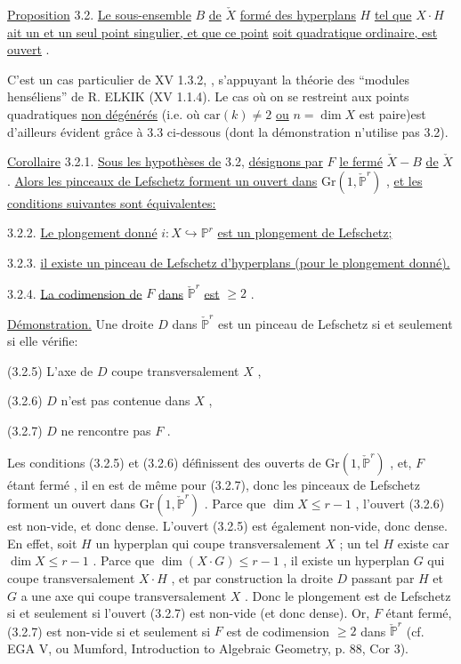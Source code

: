 \underline{Proposition} 3.2. \underline{Le sous-ensemble} $B$ \underline{de} $\check{X}$ \underline{formé des hyperplans} $H$ \underline{tel que} $X \cdot H$ \underline{ait un et un seul point singulier, et que ce point}
\underline{soit quadratique ordinaire, est ouvert} .

C'est un cas particulier de XV 1.3.2, , s'appuyant la théorie des ``modules henséliens'' de R. ELKIK (XV 1.1.4). Le cas où on se restreint aux points quadratiques \underline{non dégénérés} (i.e. où $\mathrm{car}(k) \neq 2$ \underline{ou} $n=\dim X$ est paire)est d'ailleurs évident grâce à 3.3 ci-dessous (dont la démonstration n'utilise pas 3.2).

\underline{Corollaire} 3.2.1. \underline{Sous les hypothèses de} 3.2, \underline{désignons par} $F$ \underline{le fermé} $\check{X}-B$ \underline{de} $\check{X}$ . \underline{Alors les pinceaux de Lefschetz forment un ouvert dans} $\mathrm{Gr}(1, \check{\mathbb{P}}^r)$ , \underline{et les conditions suivantes sont équivalentes:}

3.2.2. \underline{Le plongement donné} $i : X \hookrightarrow \mathbb{P}^r$ \underline{est un plongement de Lefschetz;}

3.2.3. \underline{il existe un pinceau de Lefschetz d'hyperplans (pour le plongement donné).}

3.2.4. \underline{La codimension de} $F$ \underline{dans} $\check{\mathbb{P}}^r$ \underline{est} $\geq 2$ .

\underline{Démonstration.} Une droite $D$ dans $\check{\mathbb{P}}^r$ est un pinceau de Lefschetz si et seulement si elle vérifie:

(3.2.5) L'axe de $D$ coupe transversalement $X$ ,

(3.2.6) $D$ n'est pas contenue dans $X$ ,

(3.2.7) $D$ ne rencontre pas $F$ .



Les conditions (3.2.5) et (3.2.6) définissent des ouverts de $\mathrm{Gr}(1, \check{\mathbb{P}}^{r})$ , et, $F$ étant fermé , il en est de même pour (3.2.7), donc les pinceaux de Lefschetz forment un ouvert dans $\mathrm{Gr}(1, \check{\mathbb{P}}^{r})$ . Parce que $\dim X \leq r-1$ , l'ouvert (3.2.6) est non-vide, et donc dense. L'ouvert (3.2.5) est également non-vide, donc dense. En effet, soit $H$ un hyperplan qui coupe transversalement $X$ ; un tel $H$ existe car $\dim X \leq r-1$ . Parce que $\dim (X \cdot G) \leq r-1$ , il existe un hyperplan $G$ qui coupe transversalement $X \cdot H$ , et par construction la droite $D$ passant par $H$ et $G$ a une axe qui coupe transversalement $X$ . Donc le plongement est de Lefschetz si et seulement si l'ouvert (3.2.7) est non-vide (et donc dense). Or, $F$ étant fermé, (3.2.7) est non-vide si et seulement si $F$ est de codimension $\geq 2$ dans $\check{\mathbb{P}}^{r}$ (cf. EGA V, ou Mumford, Introduction to Algebraic Geometry, p. 88, Cor 3).

